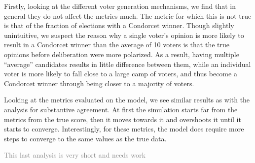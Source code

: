 Firstly, looking at the different voter generation mechanisms, we find that in
general they do not affect the metrics much. The metric for which this is not
true is that of the fraction of elections with a Condorcet winner. Though
slightly unintuitive, we suspect the reason why a single voter's opinion is
more likely to result in a Condorcet winner than the average of 10 voters is
that the true opinions before deliberation were more polarized. As a result,
having multiple ``average'' candidates results in little difference between
them, while an individual voter is more likely to fall close to a large camp of
voters, and thus become a Condorcet winner through being closer to a majority
of voters.

Looking at the metrics evaluated on the model, we see similar results as with
the analysis for substantive agreement. At first the simulation starts far from
the metrics from the true score, then it moves towards it and overshoots it
until it starts to converge. Interestingly, for these metrics, the model does require more steps to converge to the same values as the true data.

\textcolor{gray}{This last analysis is very short and needs work}
